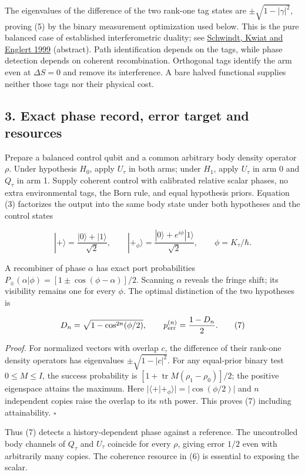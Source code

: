 \documentclass[11pt,a4paper]{article}
\begin{document}
The eigenvalues of the difference of the two rank-one tag states are
\(\pm\sqrt{1-|\gamma|^2}\), proving (5) by the binary measurement
optimization used below. This is the pure balanced case of established
interferometric duality; see
\href{https://arxiv.org/abs/quant-ph/9908072}{Schwindt, Kwiat and
Englert 1999} (abstract). Path identification depends on the tags, while
phase detection depends on coherent recombination. Orthogonal tags
identify the arm even at \(\Delta S=0\) and remove its interference. A
bare halved functional supplies neither those tags nor their physical
cost.

\subsection{3. Exact phase record, error target and
resources}\label{exact-phase-record-error-target-and-resources}

Prepare a balanced control qubit and a common arbitrary body density
operator \(\rho\). Under hypothesis \(H_0\), apply \(U_\tau\) in both
arms; under \(H_1\), apply \(U_\tau\) in arm 0 and \(Q_\tau\) in arm 1.
Supply coherent control with calibrated relative scalar phases, no extra
environmental tags, the Born rule, and equal hypothesis priors. Equation
(3) factorizes the output into the same body state under both hypotheses
and the control states

\[
|+\rangle=\frac{|0\rangle+|1\rangle}{\sqrt2},\qquad
|+_\phi\rangle=\frac{|0\rangle+e^{i\phi}|1\rangle}{\sqrt2},
\qquad \phi=K_\tau/\hbar.\tag{6}
\]

A recombiner of phase \(\alpha\) has exact port probabilities
\(P_\pm(\alpha|\phi)=[1\pm\cos(\phi-\alpha)]/2\). Scanning \(\alpha\)
reveals the fringe shift; its visibility remains one for every \(\phi\).
The optimal distinction of the two hypotheses is

\[
D_n=\sqrt{1-\cos^{2n}(\phi/2)},\qquad
p_{\rm err}^{(n)}=\frac{1-D_n}{2}.\tag{7}
\]

\emph{Proof.} For normalized vectors with overlap \(c\), the difference
of their rank-one density operators has eigenvalues
\(\pm\sqrt{1-|c|^2}\). For any equal-prior binary test \(0\le M\le I\),
the success probability is \([1+\operatorname{tr}M(\rho_1-\rho_0)]/2\);
the positive eigenspace attains the maximum. Here
\(|\langle+|+_\phi\rangle|=|\cos(\phi/2)|\) and \(n\) independent copies
raise the overlap to its \(n\)th power. This proves (7) including
attainability. \(\square\)

Thus (7) detects a history-dependent phase against a reference. The
uncontrolled body channels of \(Q_\tau\) and \(U_\tau\) coincide for
every \(\rho\), giving error \(1/2\) even with arbitrarily many copies.
The coherence resource in (6) is essential to exposing the scalar.
\end{document}
